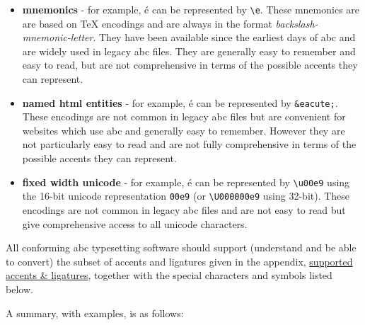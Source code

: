 \begin{itemize}
\item
  \textbf{mnemonics} - for example, é can be represented by
  \texttt{\textbackslash{}\textquotesingle{}e}. These mnemonics are are
  based on TeX encodings and are always in the format
  \emph{backslash-mnemonic-letter}. They have been available since the
  earliest days of abc and are widely used in legacy abc files. They are
  generally easy to remember and easy to read, but are not comprehensive
  in terms of the possible accents they can represent.
\item
  \textbf{named html entities} - for example, é can be represented by
  \texttt{\&eacute;}. These encodings are not common in legacy abc files
  but are convenient for websites which use abc and generally easy to
  remember. However they are not particularly easy to read and are not
  fully comprehensive in terms of the possible accents they can
  represent.
\item
  \textbf{fixed width unicode} - for example, é can be represented by
  \texttt{\textbackslash{}u00e9} using the 16-bit unicode representation
  \texttt{00e9} (or \texttt{\textbackslash{}U000000e9} using 32-bit).
  These encodings are not common in legacy abc files and are not easy to
  read but give comprehensive access to all unicode characters.
\end{itemize}

All conforming abc typesetting software should support (understand and
be able to convert) the subset of accents and ligatures given in the
appendix, \protect\hyperlink{supported_accents_ligatures}{supported
accents \& ligatures}, together with the special characters and symbols
listed below.

A summary, with examples, is as follows:

